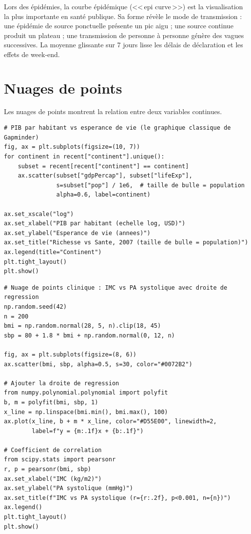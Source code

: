 \begin{clinicalnote}
Lors des \'epid\'emies, la courbe \'epid\'emique (<<\,epi curve\,>>) est la visualisation la plus importante en sant\'e publique. Sa forme r\'ev\`ele le mode de transmission : une \'epid\'emie de source ponctuelle pr\'esente un pic aigu ; une source continue produit un plateau ; une transmission de personne \`a personne g\'en\`ere des vagues successives. La moyenne glissante sur 7 jours lisse les d\'elais de d\'eclaration et les effets de week-end.
\end{clinicalnote}

\section{Nuages de points}

Les nuages de points montrent la relation entre deux variables continues.

\begin{verbatim}
# PIB par habitant vs esperance de vie (le graphique classique de Gapminder)
fig, ax = plt.subplots(figsize=(10, 7))
for continent in recent["continent"].unique():
    subset = recent[recent["continent"] == continent]
    ax.scatter(subset["gdpPercap"], subset["lifeExp"],
               s=subset["pop"] / 1e6,  # taille de bulle = population
               alpha=0.6, label=continent)

ax.set_xscale("log")
ax.set_xlabel("PIB par habitant (echelle log, USD)")
ax.set_ylabel("Esperance de vie (annees)")
ax.set_title("Richesse vs Sante, 2007 (taille de bulle = population)")
ax.legend(title="Continent")
plt.tight_layout()
plt.show()
\end{verbatim}

\begin{verbatim}
# Nuage de points clinique : IMC vs PA systolique avec droite de regression
np.random.seed(42)
n = 200
bmi = np.random.normal(28, 5, n).clip(18, 45)
sbp = 80 + 1.8 * bmi + np.random.normal(0, 12, n)

fig, ax = plt.subplots(figsize=(8, 6))
ax.scatter(bmi, sbp, alpha=0.5, s=30, color="#0072B2")

# Ajouter la droite de regression
from numpy.polynomial.polynomial import polyfit
b, m = polyfit(bmi, sbp, 1)
x_line = np.linspace(bmi.min(), bmi.max(), 100)
ax.plot(x_line, b + m * x_line, color="#D55E00", linewidth=2,
        label=f"y = {m:.1f}x + {b:.1f}")

# Coefficient de correlation
from scipy.stats import pearsonr
r, p = pearsonr(bmi, sbp)
ax.set_xlabel("IMC (kg/m2)")
ax.set_ylabel("PA systolique (mmHg)")
ax.set_title(f"IMC vs PA systolique (r={r:.2f}, p<0.001, n={n})")
ax.legend()
plt.tight_layout()
plt.show()
\end{verbatim}

